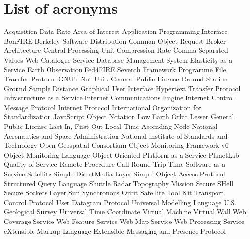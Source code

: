 \chapter{List of acronyms}

{\small
\begin{acronym}[XXXXXXXX]
     {Acquisition Data Rate}
      {Area of Interest}
   {Application Programming Interface}
       {BonFIRE}
   {Berkeley Software Distribution}
   {Common Object Request Broker Architecture}
     {Central Processing Unit}
      {Compression Rate}
     {Comma Separated Values}
       {Web Catalogue Service}
    {Database Management System}
    {Elasticity as a Service}
   {Earth Observation}
       {Fed4FIRE}
   {Seventh Framework Programme}
     {File Transfer Protocol}
       {\acs{GNU}'s Not Unix}
   {General Public License}
      {Ground Station}
   {Ground Sample Distance}
   {Graphical User Interface}
    {Hypertext Transfer Protocol}
   {Infrastructure as a Service}
   {Internet Communications Engine}
   {Internet Control Message Protocol}
   {Internet Protocol}
   {International Organization for Standardization}
   {JavaScript Object Notation}
   {Low Earth Orbit}
   {Lesser General Public License}
    {Last In, First Out}
   {Local Time Ascending Node}
   {National Aeronautics and Space Administration}
   {National Institute of Standards and Technology}
   {Open Geospatial Consortium}
   {Object Monitoring Framework v6}
   {Object Monitoring Language}
        {Object Oriented}
   {Platform as a Service}
      {PlanetLab}
   {Quality of Service}
       {Remote Procedure Call}
   {Round Trip Time}
   {Software as a Service}
     {Satellite}
   {Simple DirectMedia Layer}
   {Simple Object Access Protocol}
     {Structured Query Language}
   {Shuttle Radar Topography Mission}
   {Secure SHell}
   {Secure Sockets Layer}
   {Sun Synchronous Orbit}
     {Satellite Tool Kit}
   {Transport Control Protocol}
   {User Datagram Protocol}
     {Universal Modelling Language}
   {U.S. Geological Survey}
     {Universal Time Coordinate}
      {Virtual Machine}
      {Virtual Wall}
   {Web Coverage Service}
   {Web Feature Service}
   {Web Map Service}
   {Web Processing Service}
      {eXtensible Markup Language}
   {Extensible Messaging and Presence Protocol}
\end{acronym}
}


